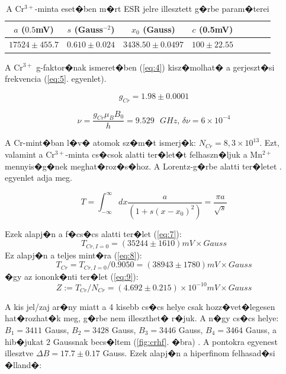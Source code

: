 \documentclass[a4paper,12pt]{article}
\begin{document}
\begin{table}
\begin{center}
\begin{tabular}{|c|c|c|c|c|c|c|c|}
 \hline
$a$ ($0.5$mV) & $s$ (Gauss$^{-2}$) & $x_0$ (Gauss) & $c$ (0.5mV)\\ \hline
$17524 \pm 455.7$ & $0.610 \pm 0.024$ & $3438.50 \pm 0.0497$ & $100 \pm 22.55$  \\ \hline
\end{tabular}
\caption{A Cr$^{3+}$-minta eset�ben m�rt ESR jelre illesztett g�rbe param�terei}
\label{tab:1}
\end{center}
\end{table}

A Cr$^{3+}$ g-faktor�nak ismeret�ben (\ref{eq:4}) kisz�molhat� a gerjeszt�si frekvencia (\ref{eq:5}. egyenlet).

\begin{equation}
g_{Cr}=1.98 \pm 0.0001
\label{eq:4}
\end{equation} 

\begin{equation}
\nu = \dfrac{g_{Cr}\mu_{B}B_0}{h} = 9.529 \text{ } GHz\text{,         } \delta\nu = 6\times 10^{-4}
\label{eq:5}
\end{equation}

A Cr-mint�ban l�v� atomok sz�m�t ismerj�k: $N_{Cr} = 8,3 \times 10^{13}$. Ezt, valamint a Cr$^{3+}$-minta cs�csok alatti ter�let�t felhaszn�ljuk a Mn$^{2+}$ mennyis�g�nek meghat�roz�s�hoz. A Lorentz-g�rbe alatti ter�letet . egyenlet adja meg.

\begin{equation}
T=\int_{-\infty}^{\infty}dx \frac{a}{(1+s(x-x_0)^2)}= \frac{\pi a}{\sqrt{s}}
\label{eq:6}
\end{equation}

Ezek alapj�n a f�cs�cs alatti ter�let (\ref{eq:7}):
\begin{equation}
T_{Cr, I=0}=(35244\pm 1610)  mV\times Gauss
\label{eq:7}
\end{equation}
Ez alapj�n a teljes mint�ra (\ref{eq:8}):
\begin{equation}
T_{Cr}=T_{Cr, I=0}/0.9050 = (38943 \pm 1780) mV\times Gauss
\label{eq:8}
\end{equation}
�gy az iononk�nti ter�let (\ref{eq:9}):
\begin{equation}
Z:=T_{Cr}/N_{Cr}=(4.692 \pm 0.215)\times 10^{-10} mV\times Gauss
\label{eq:9}
\end{equation}

A kis jel/zaj ar�ny miatt a 4 kisebb cs�cs helye csak hozz�vet�legesen hat�rozhat�k meg, g�rbe nem illeszthet� r�juk. A n�gy cs�cs helye: $B_1 = 3411$ Gauss, $B_2 = 3428$ Gauss, $B_3 = 3446$ Gauss, $B_4 = 3464$ Gauss, a hib�jukat $2$ Gaussnak becs�ltem (\ref{fig:crhf}. �bra) . A pontokra egyenest illesztve $\Delta B = 17.7 \pm 0.17$ Gauss. Ezek alapj�n a hiperfinom felhasad�si �lland�:
\end{document}
